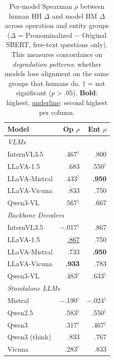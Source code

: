 \begin{table}[ht]
\small\centering
\setlength{\tabcolsep}{5pt}
\caption{Per-model Spearman $\rho$ between human HH $\Delta$ and model HM $\Delta$ across operation and entity groups ($\Delta$ = Pronominalized $-$ Original SBERT, free-text questions only). This measures concordance on \emph{degradation patterns}: whether models lose alignment on the same groups that humans do. $\dagger$ = not significant ($p{>}.05$). \textbf{Bold}: highest; \underline{underline}: second highest per column.}
\label{tab:per_model_r}
\begin{tabular}{lrr}
\toprule
\textbf{Model} & \textbf{Op} $\rho$ & \textbf{Ent} $\rho$ \\
\midrule
\multicolumn{3}{l}{\textit{VLMs}} \\
InternVL3.5 & .467$^{\dagger}$ & .800 \\
LLaVA-1.5 & .683 & .550$^{\dagger}$ \\
LLaVA-Mistral & .433$^{\dagger}$ & \textbf{.950} \\
LLaVA-Vicuna & .833 & .750 \\
Qwen3-VL & .567$^{\dagger}$ & .667 \\
\midrule
\multicolumn{3}{l}{\textit{Backbone Decoders}} \\
InternVL3.5 & $-$.017$^{\dagger}$ & .867 \\
LLaVA-1.5 & \underline{.867} & .750 \\
LLaVA-Mistral & .733 & \textbf{.950} \\
LLaVA-Vicuna & \textbf{.933} & .783 \\
Qwen3-VL & .483$^{\dagger}$ & .633$^{\dagger}$ \\
\midrule
\multicolumn{3}{l}{\textit{Standalone LLMs}} \\
Mistral & $-$.190$^{\dagger}$ & $-$.024$^{\dagger}$ \\
Qwen2.5 & .583$^{\dagger}$ & .550$^{\dagger}$ \\
Qwen3 & .317$^{\dagger}$ & .467$^{\dagger}$ \\
Qwen3 (think) & .833 & .767 \\
Vicuna & .283$^{\dagger}$ & .833 \\
\bottomrule
\end{tabular}
\end{table}
